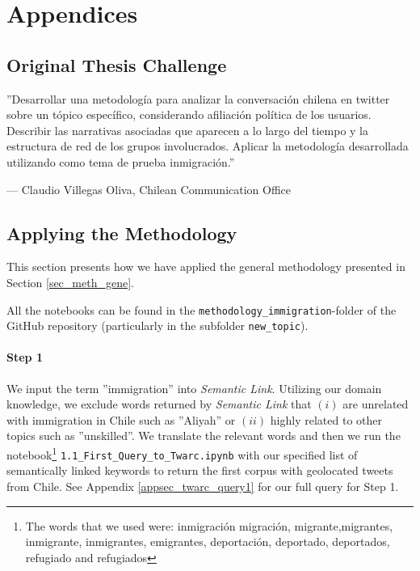 \newpage
\appendix
    \renewcommand\thefigure{\thesection.\arabic{figure}} %
    \renewcommand{\thetable}{A.\arabic{table}} %
    \setcounter{figure}{0} %
    \setcounter{table}{0}


\section{Appendices}
    \subsection{Original Thesis Challenge}\label{app_sec_challenge}
        \epigraph{''Desarrollar una metodología para analizar la conversación chilena en twitter sobre un tópico específico, considerando afiliación política de los usuarios. Describir las narrativas asociadas que aparecen a lo largo del tiempo y la estructura de red de los grupos involucrados. Aplicar la metodología desarrollada utilizando como tema de prueba inmigración.''}{--- Claudio Villegas Oliva, Chilean Communication Office}
    
    
    
    
    \subsection{Applying the Methodology}\label{app_sec_meth}

            This section presents how we have applied the general methodology presented in Section \ref{sec_meth_gene}.
            
            All the notebooks can be found in the \texttt{methodology\_immigration}-folder of the GitHub repository (particularly in the subfolder \texttt{new\_topic}).
   
        \paragraph{Step 1} 
            We input the term ''immigration'' into {\it Semantic Link}. Utilizing our domain knowledge, we exclude words returned by {\it Semantic Link} that $(i)$ are unrelated with immigration in Chile such as ''Aliyah'' or $(ii)$ highly related to other topics such as ''unskilled''. We translate the relevant words and then we run the notebook\footnote{The words that we used were: inmigración  migración, migrante,migrantes, inmigrante, inmigrantes, emigrantes, deportación, deportado, deportados, refugiado and refugiados} \texttt{1.1\_First\_Query\_to\_Twarc.ipynb} with our specified list of semantically linked keywords to return the first corpus with geolocated tweets from Chile. See Appendix \ref{appsec_twarc_query1} for our full query for Step 1.
    
